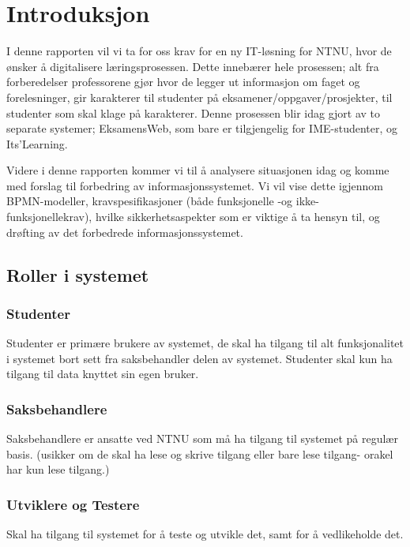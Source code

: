 \documentclass[12pt]{article}
\begin{document}

\newpage
\newpage
\tableofcontents
\newpage

\section{Introduksjon}

I denne rapporten vil vi ta for oss krav for en ny IT-løsning for NTNU, hvor de ønsker å digitalisere læringsprosessen. Dette innebærer hele prosessen; alt fra forberedelser professorene gjør hvor de legger ut informasjon om faget og forelesninger, gir karakterer til studenter på eksamener/oppgaver/prosjekter, til studenter som skal klage på karakterer. Denne prosessen blir idag gjort av to separate systemer; EksamensWeb, som bare er tilgjengelig for IME-studenter, og Its’Learning. 

Videre i denne rapporten kommer vi til å analysere situasjonen idag og komme med forslag til forbedring av informasjonssystemet. Vi vil vise dette igjennom BPMN-modeller, kravspesifikasjoner (både funksjonelle -og ikke-funksjonellekrav), hvilke sikkerhetsaspekter som er viktige å ta hensyn til, og drøfting av det forbedrede informasjonssystemet.

\subsection{Roller i systemet}

\subsubsection*{Studenter}
Studenter er primære brukere av systemet, de skal ha tilgang til alt funksjonalitet i systemet bort sett fra saksbehandler delen av systemet. Studenter skal kun ha tilgang til data knyttet sin egen bruker.

\subsubsection*{Saksbehandlere}
Saksbehandlere er ansatte ved NTNU som må ha tilgang til systemet på regulær basis. (usikker om de skal ha lese og skrive tilgang eller bare lese tilgang- orakel har kun lese tilgang.)

\subsubsection*{Utviklere og Testere}

Skal ha tilgang til systemet for å teste og utvikle det, samt for å vedlikeholde det.
 
\end{document}
